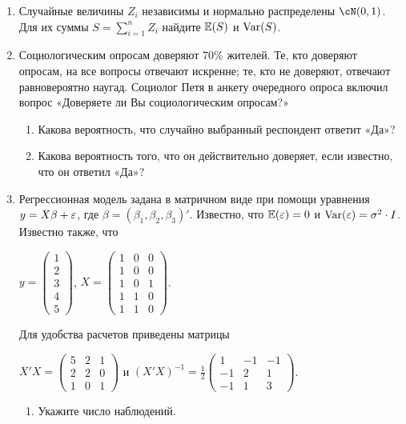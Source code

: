 \documentclass[12pt, a4paper]{article}
\theoremstyle{definition}
\begin{document}
\begin{enumerate}
\item Случайные величины $Z_i$ независимы и нормально распределены $\cN(0,1)$. Для их суммы $S=\sum_{i=1}^n Z_i$ найдите $\mathbb{E}(S)$ и $\operatorname{Var}(S)$.
\item Социологическим опросам доверяют 70\% жителей. Те, кто доверяют
опросам, на все вопросы отвечают искренне; те, кто не доверяют, отвечают равновероятно наугад. Социолог Петя в анкету очередного опроса включил вопрос «Доверяете ли Вы социологическим опросам?»
\begin{enumerate}
\item Какова вероятность, что случайно выбранный респондент ответит «Да»?
\item Какова вероятность того, что он действительно доверяет, если известно, что он ответил
«Да»?
\end{enumerate}
\item Регрессионная модель  задана в матричном виде при помощи уравнения $y=X\beta+\varepsilon$, где $\beta=(\beta_1,\beta_2,\beta_3)'$.
Известно, что $\mathbb{E}(\varepsilon)=0$  и  $\operatorname{Var}(\varepsilon)=\sigma^2\cdot I$.
Известно также, что

$y=\left(
\begin{array}{c}
1\\
2\\
3\\
4\\
5
\end{array}\right)$,
$X=\left(\begin{array}{ccc}
1 & 0 & 0 \\
1 & 0 & 0 \\
1 & 0 & 1 \\
1 & 1 & 0 \\
1 & 1 & 0
\end{array}\right)$.


Для удобства расчетов приведены матрицы


$X'X=\left(
\begin{array}{ccc}
5 & 2 & 1\\
2 & 2 & 0\\
1 & 0 & 1
\end{array}\right)$ и $(X'X)^{-1}=\frac{1}{2}\left(
\begin{array}{ccc}
1 & -1 & -1 \\
-1 & 2 & 1 \\
-1 & 1 & 3
\end{array}\right)$.

\begin{enumerate}
\item Укажите число наблюдений.


\end{enumerate}
\end{enumerate}
\end{document}
